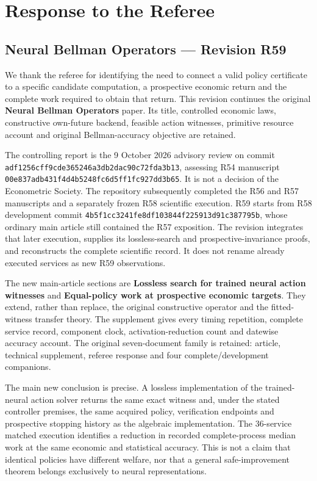 \hypertarget{response-to-the-referee}{%
\section{Response to the Referee}\label{response-to-the-referee}}

\hypertarget{neural-bellman-operators-revision-r59}{%
\subsection{Neural Bellman Operators --- Revision
R59}\label{neural-bellman-operators-revision-r59}}

We thank the referee for identifying the need to connect a valid policy
certificate to a specific candidate computation, a prospective economic
return and the complete work required to obtain that return. This
revision continues the original \textbf{Neural Bellman Operators} paper.
Its title, controlled economic laws, constructive own-future backend,
feasible action witnesses, primitive resource account and original
Bellman-accuracy objective are retained.

The controlling report is the 9 October 2026 advisory review on commit
\texttt{adf1256cff9cde365246a3db2dac90c72fda3b13}, assessing R54
manuscript \texttt{00e837adb431f4d4b5248fc6d5ff1fc927dd3b65}. It is not
a decision of the Econometric Society. The repository subsequently
completed the R56 and R57 manuscripts and a separately frozen R58
scientific execution. R59 starts from R58 development commit
\texttt{4b5f1cc3241fe8df103844f225913d91c387795b}, whose ordinary main
article still contained the R57 exposition. The revision integrates that
later execution, supplies its lossless-search and prospective-invariance
proofs, and reconstructs the complete scientific record. It does not
rename already executed services as new R59 observations.

The new main-article sections are \textbf{Lossless search for trained
neural action witnesses} and \textbf{Equal-policy work at prospective
economic targets}. They extend, rather than replace, the original
constructive operator and the fitted-witness transfer theory. The
supplement gives every timing repetition, complete service record,
component clock, activation-reduction count and datewise accuracy
account. The original seven-document family is retained: article,
technical supplement, referee response and four complete/development
companions.

The main new conclusion is precise. A lossless implementation of the
trained-neural action solver returns the same exact witness and, under
the stated controller premises, the same acquired policy, verification
endpoints and prospective stopping history as the algebraic
implementation. The 36-service matched execution identifies a reduction
in recorded complete-process median work at the same economic and
statistical accuracy. This is not a claim that identical policies have
different welfare, nor that a general safe-improvement theorem belongs
exclusively to neural representations.

